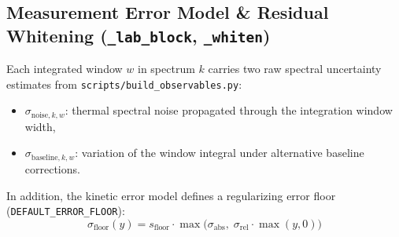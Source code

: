 \documentclass[11pt,a4paper]{article}
\begin{document}
\subsection{Measurement Error Model \& Residual Whitening (\texttt{\_\allowbreak{}lab\_\allowbreak{}block}, \texttt{\_\allowbreak{}whiten})}

Each integrated window $w$ in spectrum $k$ carries two raw spectral uncertainty estimates from \texttt{scripts/\allowbreak{}build\_\allowbreak{}observables.py}:
\begin{itemize}[leftmargin=1.8em]
    \item $\sigma_{\text{noise}, k, w}$: thermal spectral noise propagated through the integration window width,
    \item $\sigma_{\text{baseline}, k, w}$: variation of the window integral under alternative baseline corrections.
\end{itemize}

In addition, the kinetic error model defines a regularizing error floor (\texttt{DEFAULT\_\allowbreak{}ERROR\_\allowbreak{}FLOOR}):
\begin{equation}
\sigma_{\text{floor}}(y) = s_{\text{floor}} \cdot \max\!\big( \sigma_{\text{abs}},\; \sigma_{\text{rel}} \cdot \max(y, 0) \big)
\end{equation}
\end{document}

